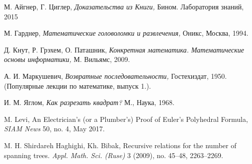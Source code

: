 \documentclass{article}
\begin{document}
\begin{thebibliography}{52}

 М. Айгнер, Г. Циглер, 
\emph{Доказательства из Книги,} 
Бином. Лаборатория знаний, 2015 

 М. Гарднер, \emph{Математические головоломки и развлечения,}  Оникс, Москва, 1994.

Д. Кнут, Р. Грэхем, О. Паташник,
\emph{Конкретная математика. Математические основы информатики,}
М. Вильямс, 
2009.

А. И. Маркушевич,
\emph{Возвратные последовательности,} 
Гостехиздат, 1950. 
(Популярные лекции по математике, выпуск 1.).


И. М. Яглом,
\emph{Как разрезать квадрат?}
М., Наука, 1968.

 M. Levi,
An Electrician’s (or a Plumber’s)
Proof of Euler’s Polyhedral Formula,
\emph{SIAM News} 50, no. 4, May 2017.


 M. H. Shirdareh Haghighi, Kh. Bibak, 
Recursive relations for the number of spanning trees. 
\emph{Appl. Math. Sci. (Ruse)} 3 (2009), no. 45--48, 2263--2269. 
\end{thebibliography}
\end{document}
